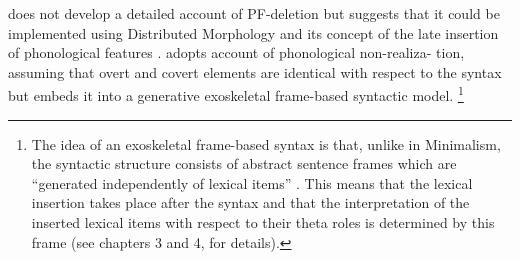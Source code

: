 \citet{mornsjo2002} does not develop a detailed account of PF-deletion but suggests that it could be implemented using Distributed Morphology \citep{halle.marantz1993} and its concept of the late insertion of phonological features \citep[133]{mornsjo2002}.
\citet{nygard2018}  adopts  account of phonological non-realiza- tion, assuming that overt and covert elements are identical with respect to the syntax \citep[47]{nygard2018} but embeds it into a generative exoskeletal frame-based syntactic model.%
\footnote{The idea of an exoskeletal frame-based syntax is that, unlike in Minimalism, the syntactic structure consists of abstract sentence frames which are ``generated independently of lexical items'' \citep[78]{nygard2018}.
This means that the lexical insertion takes place after the syntax and that the interpretation of the inserted lexical items with respect to their theta roles is determined by this frame (see  chapters 3 and 4, for details).
}
%

